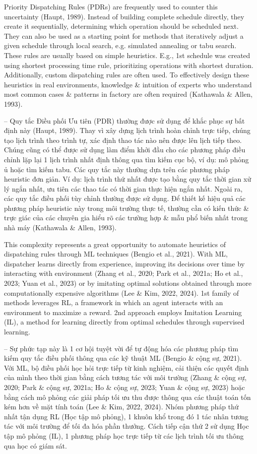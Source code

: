 \documentclass{article}
\begin{document}
\begin{itemize}
    Priority Dispatching Rules (PDRs) are frequently used to counter this uncertainty (Haupt, 1989). Instead of building complete schedule directly, they create it sequentially, determining which operation should be scheduled next. They can also be used as a starting point for methods that iteratively adjust a given schedule through local search, e.g. simulated annealing or tabu search. These rules are usually based on simple heuristics. E.g., 1st schedule was created using shortest processing time rule, prioritizing operations with shortest duration. Additionally, custom dispatching rules are often used. To effectively design these heuristics in real environments, knowledge \& intuition of experts who understand most common cases \& patterns in factory are often required (Kathawala \& Allen, 1993).

    -- Quy tắc Điều phối Ưu tiên (PDR) thường được sử dụng để khắc phục sự bất định này (Haupt, 1989). Thay vì xây dựng lịch trình hoàn chỉnh trực tiếp, chúng tạo lịch trình theo trình tự, xác định thao tác nào nên được lên lịch tiếp theo. Chúng cũng có thể được sử dụng làm điểm khởi đầu cho các phương pháp điều chỉnh lặp lại 1 lịch trình nhất định thông qua tìm kiếm cục bộ, ví dụ: mô phỏng ủ hoặc tìm kiếm tabu. Các quy tắc này thường dựa trên các phương pháp heuristic đơn giản. Ví dụ: lịch trình thứ nhất được tạo bằng quy tắc thời gian xử lý ngắn nhất, ưu tiên các thao tác có thời gian thực hiện ngắn nhất. Ngoài ra, các quy tắc điều phối tùy chỉnh thường được sử dụng. Để thiết kế hiệu quả các phương pháp heuristic này trong môi trường thực tế, thường cần có kiến thức \& trực giác của các chuyên gia hiểu rõ các trường hợp \& mẫu phổ biến nhất trong nhà máy (Kathawala \& Allen, 1993).

    This complexity represents a great opportunity to automate heuristics of dispatching rules through ML techniques (Bengio et al., 2021). With ML, dispatcher learns directly from experience, improving its decisions over time by interacting with environment (Zhang et al., 2020; Park et al., 2021a; Ho et al., 2023; Yuan et al., 2023) or by imitating optimal solutions obtained through more computationally expensive algorithms (Lee \& Kim, 2022, 2024). 1st family of methods leverages RL, a framework in which an agent interacts with an environment to maximize a reward. 2nd approach employs Imitation Learning (IL), a method for learning directly from optimal schedules through supervised learning.

    -- Sự phức tạp này là 1 cơ hội tuyệt vời để tự động hóa các phương pháp tìm kiếm quy tắc điều phối thông qua các kỹ thuật ML (Bengio \& cộng sự, 2021). Với ML, bộ điều phối học hỏi trực tiếp từ kinh nghiệm, cải thiện các quyết định của mình theo thời gian bằng cách tương tác với môi trường (Zhang \& cộng sự, 2020; Park \& cộng sự, 2021a; Ho \& cộng sự, 2023; Yuan \& cộng sự, 2023) hoặc bằng cách mô phỏng các giải pháp tối ưu thu được thông qua các thuật toán tốn kém hơn về mặt tính toán (Lee \& Kim, 2022, 2024). Nhóm phương pháp thứ nhất tận dụng RL (Học tập mô phỏng), 1 khuôn khổ trong đó 1 tác nhân tương tác với môi trường để tối đa hóa phần thưởng. Cách tiếp cận thứ 2 sử dụng Học tập mô phỏng (IL), 1 phương pháp học trực tiếp từ các lịch trình tối ưu thông qua học có giám sát.


\end{itemize}
\end{document}
